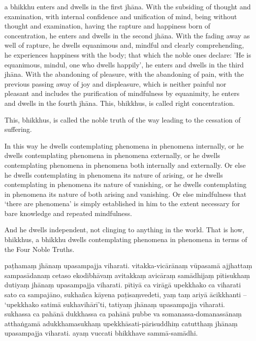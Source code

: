 \englishPage

a bhikkhu enters and dwells in the first jhāna. With the subsiding of thought
and examination, with internal confidence and unification of mind, being without
thought and examination, having the rapture and happiness born of concentration,
he enters and dwells in the second jhāna. With the fading away as well of
rapture, he dwells equanimous and, mindful and clearly comprehending, he
experiences happiness with the body; that which the noble ones declare: 'He is
equanimous, mindul, one who dwells happily', he enters and dwells in the third
jhāna. With the abandoning of pleasure, with the abandoning of pain, with the
previous passing away of joy and displeasure, which is neither painful nor
pleasant and includes the purification of mindfulness by equanimity, he enters
and dwells in the fourth jhāna. This, bhikkhus, is called right concentration.

This, bhikkhus, is called the noble truth of the way leading to the cessation of
suffering.

In this way he dwells contemplating phenomena in phenomena internally, or he
dwells contemplating phenomena in phenomena externally, or he dwells
contemplating phenomena in phenomena both internally and externally. Or else he
dwells contemplating in phenomena its nature of arising, or he dwells
contemplating in phenomena its nature of vanishing, or he dwells contemplating
in phenomena its nature of both arising and vanishing. Or else mindfulness that
‘there are phenomena’ is simply established in him to the extent necessary for
bare knowledge and repeated mindfulness.

And he dwells independent, not clinging to anything in the world. That is how,
bhikkhus, a bhikkhu dwells contemplating phenomena in phenomena in terms of the
Four Noble Truths.



\paliPage

paṭhamaṃ jhānaṃ upasampajja viharati. vitakka-vicārānaṃ vūpasamā ajjhattaṃ
sampasādanaṃ cetaso ekodibhāvaṃ avitakkaṃ avicāraṃ samādhijaṃ pītisukhaṃ dutiyaṃ
jhānaṃ upasampajja viharati. pītiyā ca virāgā upekkhako ca viharati sato ca
sampajāno, sukhañca kāyena paṭisaṃvedeti, yaṃ taṃ ariyā ācikkhanti -- ‘upekkhako
satimā sukhavihārī’ti, tatiyaṃ jhānaṃ upasampajja viharati. sukhassa ca pahānā
dukkhassa ca pahānā pubbe va somanassa-domanassānaṃ atthaṅgamā adukkhamasukhaṃ
upekkhāsati-pārisuddhiṃ catutthaṃ jhānaṃ upasampajja viharati. ayaṃ vuccati
bhikkhave sammā-samādhi.

